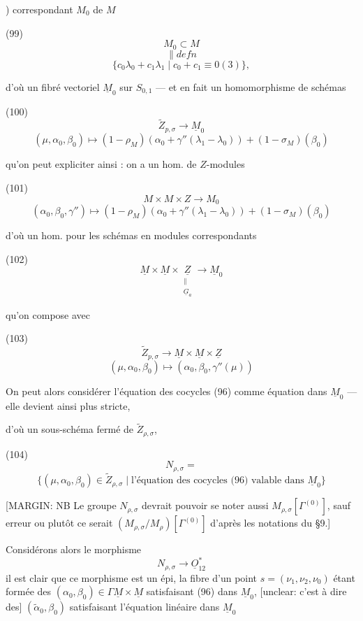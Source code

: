 \newpage


) correspondant $M_0$ de $M$

(99)
$$ M_0 \subset M $$
$$ \| defn $$
$$ \{ c_0 \lambda_0 + c_1 \lambda_1 \mid c_0 + c_1 \equiv 0 (3) \} , $$

d'où un fibré vectoriel $\underline{M}_0$ sur $S_{0,1}$ —
et en fait un homomorphisme de schémas

(100)
$$ \widetilde{Z}_{p,\sigma} \longrightarrow \underline{M}_0 $$
$$ (\mu, \alpha_0, \beta_0) \longmapsto (1-\rho_M)(\alpha_0 + \gamma''(\lambda_1-\lambda_0)) + (1-\sigma_M)(\beta_0) $$

qu'on peut expliciter ainsi : on a un
hom. de $Z$-modules

(101)
$$ M \times M \times Z \longrightarrow M_0 $$
$$ (\alpha_0, \beta_0, \gamma'') \longmapsto (1-\rho_M)(\alpha_0 + \gamma''(\lambda_1-\lambda_0)) + (1-\sigma_M)(\beta_0) $$

d'où un hom. pour les schémas en
modules correspondants

(102)
$$ \underline{M} \times \underline{M} \times \underset{\substack{\| \\ \underline{G}_a}}{\underline{Z}} \longrightarrow \underline{M}_0 $$

qu'on compose avec

(103)
$$ \widetilde{Z}_{p,\sigma} \longrightarrow \underline{M} \times \underline{M} \times \underline{Z} $$
$$ (\mu, \alpha_0, \beta_0) \longmapsto (\alpha_0, \beta_0, \gamma''(\mu)) $$

On peut alors considérer l'équation des
cocycles (96) comme équation dans
$\underline{M}_0$ — elle devient ainsi plus stricte,

\newpage


d'où un sous-schéma fermé de $\tilde{Z}_{\rho, \sigma}$,

(104) $$N_{\rho, \sigma} = $$
$$\{ (\mu, \alpha_0, \beta_0) \in \tilde{Z}_{\rho, \sigma} \mid \text{l'équation des cocycles (96) valable dans } \underline{M}_0 \}$$

[MARGIN: NB
Le groupe $N_{\rho, \sigma}$ devrait pouvoir se noter aussi $M_{\rho, \sigma}[\Gamma^{(0)}]$, sauf erreur ou plutôt ce serait $(M_{\rho, \sigma}/M_{\rho})[\Gamma^{(0)}]$ d'après les notations du §9.]

Considérons alors le morphisme
$$N_{\rho, \sigma} \longrightarrow \underline{O}_{12}^*$$
il est clair que ce morphisme est un épi, la fibre d'un point $s = (\nu_1, \nu_2, \nu_0)$ étant formée des $(\alpha_0, \beta_0) \in \Gamma \underline{M} \times \underline{M}$ satisfaisant (96) dans $\underline{M}_0$, [unclear: c'est à dire des] $(\tilde{\alpha}_0, \beta_0)$ satisfaisant l'équation linéaire dans $\underline{M}_0$

